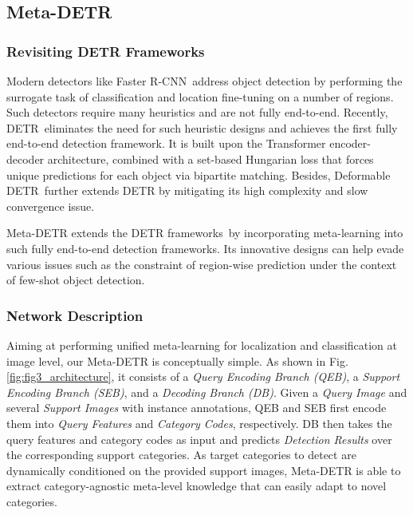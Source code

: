 \documentclass[10pt,twocolumn,letterpaper]{article}
\begin{document}
\subsection{Meta-DETR}

\subsubsection{Revisiting DETR Frameworks}
\vspace*{-0.5mm}
Modern detectors like Faster R-CNN\,\cite{FasterRCNN} address object detection by performing the surrogate task of classification and location fine-tuning on a number of regions. Such detectors require many heuristics and are not fully end-to-end. Recently, DETR\,\cite{DETR} eliminates the need for such heuristic designs and achieves the first fully end-to-end detection framework. It is built upon the Transformer encoder-decoder architecture\;\cite{transformer}, combined with a set-based Hungarian loss that forces unique predictions for each object via bipartite matching. Besides, Deformable DETR\,\cite{DeformableDETR} further extends DETR by mitigating its high complexity and slow convergence issue.

Meta-DETR extends the DETR frameworks\,\cite{DETR,DeformableDETR} by incorporating meta-learning into such fully end-to-end detection frameworks. Its innovative designs can help evade various issues such as the constraint of region-wise prediction under the context of few-shot object detection.



\subsubsection{Network Description}

Aiming at performing unified meta-learning for localization and classification at image level, our Meta-DETR is conceptually simple. As shown in Fig.\;\ref{fig:fig3_architecture}, it consists of a \textit{Query Encoding Branch (QEB)}, a \textit{Support Encoding Branch (SEB)}, and a \textit{Decoding Branch (DB)}. Given a \textit{Query Image} and several \textit{Support Images} with instance annotations, QEB and SEB first encode them into \textit{Query Features} and \textit{Category Codes}, respectively. DB then takes the query features and category codes as input and predicts \textit{Detection Results} over the corresponding support categories. As target categories to detect are dynamically conditioned on the provided support images, Meta-DETR is able to extract category-agnostic meta-level knowledge that can easily adapt to novel categories.
\end{document}
